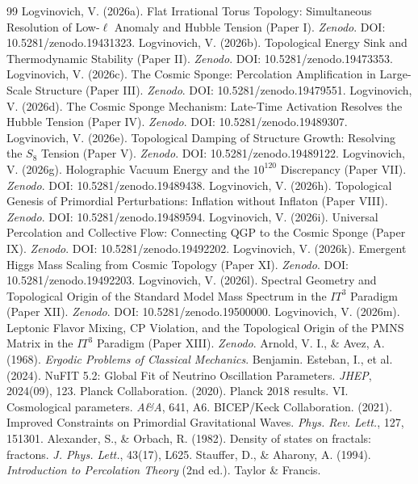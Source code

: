 \documentclass[12pt,a4paper]{article}
\begin{document}
\begin{thebibliography}{99}
 Logvinovich, V. (2026a). Flat Irrational Torus Topology: Simultaneous Resolution of Low-$\ell$ Anomaly and Hubble Tension (Paper I). \textit{Zenodo}. DOI: 10.5281/zenodo.19431323.
 Logvinovich, V. (2026b). Topological Energy Sink and Thermodynamic Stability (Paper II). \textit{Zenodo}. DOI: 10.5281/zenodo.19473353.
 Logvinovich, V. (2026c). The Cosmic Sponge: Percolation Amplification in Large-Scale Structure (Paper III). \textit{Zenodo}. DOI: 10.5281/zenodo.19479551.
 Logvinovich, V. (2026d). The Cosmic Sponge Mechanism: Late-Time Activation Resolves the Hubble Tension (Paper IV). \textit{Zenodo}. DOI: 10.5281/zenodo.19489307.
 Logvinovich, V. (2026e). Topological Damping of Structure Growth: Resolving the $S_8$ Tension (Paper V). \textit{Zenodo}. DOI: 10.5281/zenodo.19489122.
 Logvinovich, V. (2026g). Holographic Vacuum Energy and the $10^{120}$ Discrepancy (Paper VII). \textit{Zenodo}. DOI: 10.5281/zenodo.19489438.
 Logvinovich, V. (2026h). Topological Genesis of Primordial Perturbations: Inflation without Inflaton (Paper VIII). \textit{Zenodo}. DOI: 10.5281/zenodo.19489594.
 Logvinovich, V. (2026i). Universal Percolation and Collective Flow: Connecting QGP to the Cosmic Sponge (Paper IX). \textit{Zenodo}. DOI: 10.5281/zenodo.19492202.
 Logvinovich, V. (2026k). Emergent Higgs Mass Scaling from Cosmic Topology (Paper XI). \textit{Zenodo}. DOI: 10.5281/zenodo.19492203.
 Logvinovich, V. (2026l). Spectral Geometry and Topological Origin of the Standard Model Mass Spectrum in the $IT^3$ Paradigm (Paper XII). \textit{Zenodo}. DOI: 10.5281/zenodo.19500000.
 Logvinovich, V. (2026m). Leptonic Flavor Mixing, CP Violation, and the Topological Origin of the PMNS Matrix in the $IT^3$ Paradigm (Paper XIII). \textit{Zenodo}.
 Arnold, V. I., \& Avez, A. (1968). \textit{Ergodic Problems of Classical Mechanics}. Benjamin.
 Esteban, I., et al. (2024). NuFIT 5.2: Global Fit of Neutrino Oscillation Parameters. \textit{JHEP}, 2024(09), 123.
 Planck Collaboration. (2020). Planck 2018 results. VI. Cosmological parameters. \textit{A\&A}, 641, A6.
 BICEP/Keck Collaboration. (2021). Improved Constraints on Primordial Gravitational Waves. \textit{Phys. Rev. Lett.}, 127, 151301.
 Alexander, S., \& Orbach, R. (1982). Density of states on fractals: fractons. \textit{J. Phys. Lett.}, 43(17), L625.
 Stauffer, D., \& Aharony, A. (1994). \textit{Introduction to Percolation Theory} (2nd ed.). Taylor \& Francis.
\end{thebibliography}
\end{document}
